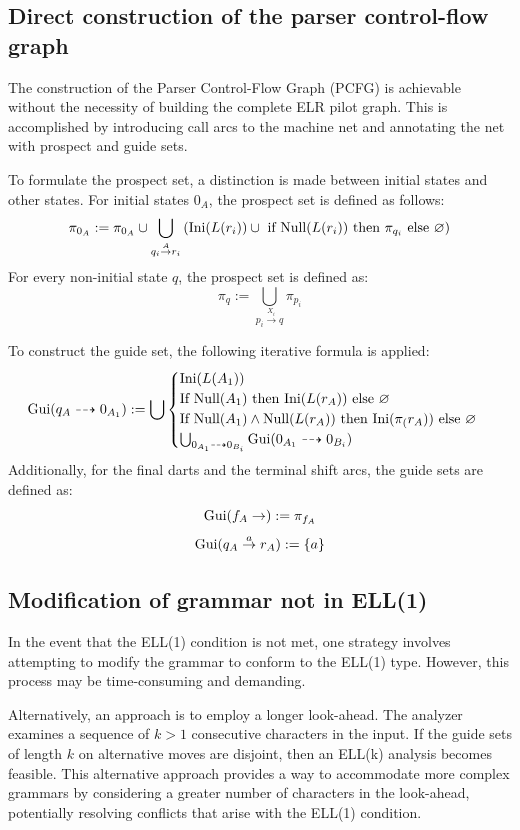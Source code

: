 \subsection{Direct construction of the parser control-flow graph}
The construction of the Parser Control-Flow Graph (PCFG) is achievable without the necessity of building the complete ELR pilot graph. 
This is accomplished by introducing call arcs to the machine net and annotating the net with prospect and guide sets.

To formulate the prospect set, a distinction is made between initial states and other states. 
For initial states $0_A$, the prospect set is defined as follows:
\[\pi_{0_A}:=\pi_{0_A} \cup \bigcup_{q_i \overset{A}{\rightarrow} r_i}\left( \textnormal{Ini}(L(r_i)) \cup \textnormal{ if Null}(L(r_i)) \textnormal{ then } \pi_{q_i} \textnormal{ else } \varnothing \right)\]
For every non-initial state $q$, the prospect set is defined as:
\[\pi_q:=\bigcup_{p_i \overset{X_i}{\rightarrow}q}\pi_{p_i}\]

To construct the guide set, the following iterative formula is applied:
\[\textnormal{Gui}(q_A \dashrightarrow 0_{A_1}):=\bigcup
\begin{cases}
    \textnormal{Ini}(L(A_1)) \\
    \textnormal{If Null}(A_1) \textnormal{ then Ini}(L(r_A)) \textnormal{ else } \varnothing \\
    \textnormal{If Null}(A_1) \land \textnormal{Null}(L(r_A)) \textnormal{ then Ini}(\pi_(r_A)) \textnormal{ else } \varnothing \\
    \bigcup_{0_{A_1} \dashrightarrow 0_{B_i}}\textnormal{Gui}(0_{A_1} \dashrightarrow 0_{B_i})
\end{cases}\]
Additionally, for the final darts and the terminal shift arcs, the guide sets are defined as:
\[\textnormal{Gui}(f_A \rightarrow):=\pi_{f_A}\]
\[\textnormal{Gui}(q_A \overset{a}{\rightarrow}r_A):=\{a\}\]

\subsection{Modification of grammar not in ELL(1)}
In the event that the ELL(1) condition is not met, one strategy involves attempting to modify the grammar to conform to the ELL(1) type. 
However, this process may be time-consuming and demanding.

Alternatively, an approach is to employ a longer look-ahead. The analyzer examines a sequence of $k > 1$ consecutive characters in the input. 
If the guide sets of length $k$ on alternative moves are disjoint, then an ELL(k) analysis becomes feasible.
This alternative approach provides a way to accommodate more complex grammars by considering a greater number of characters in the look-ahead, potentially resolving conflicts that arise with the ELL(1) condition.